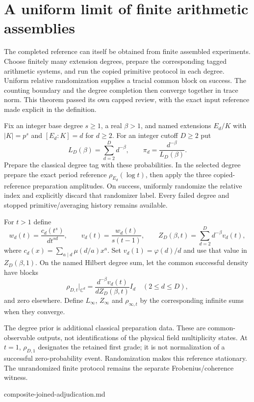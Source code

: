 \section{A uniform limit of finite arithmetic assemblies}
\label{sec:composite-joined-limit}

The completed reference can itself be obtained from finite assembled
experiments. Choose finitely many extension degrees, prepare the corresponding
tagged arithmetic systems, and run the copied primitive protocol in each
degree. Uniform relative randomization supplies a tracial common block on
success. The counting boundary and the degree completion then converge
together in trace norm. This theorem passed its own capped review, with the exact input reference
made explicit in the definition.

\begin{definition}
Fix an integer base degree $s\geq1$, a real $\beta>1$, and named extensions
$E_d/K$ with $|K|=p^s$ and $[E_d:K]=d$ for $d\geq2$. For an integer
cutoff $D\geq2$ put
\[
 L_D(\beta)=\sum_{d=2}^D d^{-\beta},\qquad
 \pi_d=\frac{d^{-\beta}}{L_D(\beta)}.
\]
Prepare the classical degree tag with these probabilities. In the selected
degree prepare the exact period reference $\rho_{E_d}(\log t)$, then apply
the three copied-reference preparation amplitudes. On success,
uniformly randomize the relative index and explicitly discard that
randomizer label. Every failed degree and stopped primitive/averaging
history remains available.

For $t>1$ define
\[
 w_d(t)=\frac{c_d(t^s)}{dt^{sd}},\qquad
 v_d(t)=\frac{w_d(t)}{s(t-1)},\qquad
 Z_D(\beta,t)=\sum_{d=2}^D d^{-\beta}v_d(t),
\]
where $c_d(x)=\sum_{a\mid d}\mu(d/a)x^a$. Set
$v_d(1)=\varphi(d)/d$ and use that value in $Z_D(\beta,1)$.
On the named Hilbert degree sum, let the common successful density have
blocks
\[
 \rho_{D,t}\big|_{\mathbb C^d}
  =\frac{d^{-\beta}v_d(t)}{dZ_D(\beta,t)}I_d
       \quad(2\leq d\leq D),
\]
and zero elsewhere. Define $L_\infty$, $Z_\infty$ and $\rho_{\infty,t}$
by the corresponding infinite sums when they converge.
\end{definition}
\begin{scope}
The degree prior is additional classical preparation data. These are
common-observable outputs, not identifications of the physical field
multiplicity states. At $t=1$, $\rho_{D,1}$ designates the retained first
grade; it is not normalization of a successful zero-probability event.
Randomization makes this reference stationary. The unrandomized finite
protocol remains the separate Frobenius/coherence witness.
\end{scope}
{composite-joined-adjudication.md}

